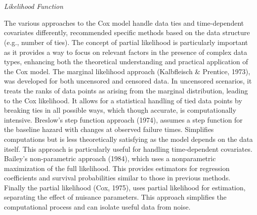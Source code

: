 \\\\
\textit{Likelihood Function}
\par \noindent The various approaches to the Cox model handle data ties and time-dependent covariates differently, \parencite{kalbfleisch_fifty_2023} recommended specific methods based on the data structure (e.g., number of ties). The concept of partial likelihood is particularly important as it provides a way to focus on relevant factors in the presence of complex data types, enhancing both the theoretical understanding and practical application of the Cox model. The marginal likelihood approach \parencite{kalbfleisch_fifty_2023} (Kalbfleisch \& Prentice, 1973), was developed for both uncensored and censored data. In uncensored scenarios, it treats the ranks of data points as arising from the marginal distribution, leading to the Cox likelihood. It allows for a statistical handling of tied data points by breaking ties in all possible ways, which though accurate, is computationally intensive. \parencite{kalbfleisch_fifty_2023} Breslow's step function approach (1974), assumes a step function for the baseline hazard with changes at observed failure times. Simplifies computations but is less theoretically satisfying as the model depends on the data itself. This approach is particularly useful for handling time-dependent covariates. \parencite{kalbfleisch_fifty_2023} Bailey's non-parametric approach (1984), which uses a nonparametric maximization of the full likelihood. This provides estimators for regression coefficients and survival probabilities similar to those in previous methods. Finally the partial likelihood \parencite{kalbfleisch_fifty_2023} (Cox, 1975), uses partial likelihood for estimation, separating the effect of nuisance parameters. This approach simplifies the computational process and can isolate useful data from noise.
\\\\




